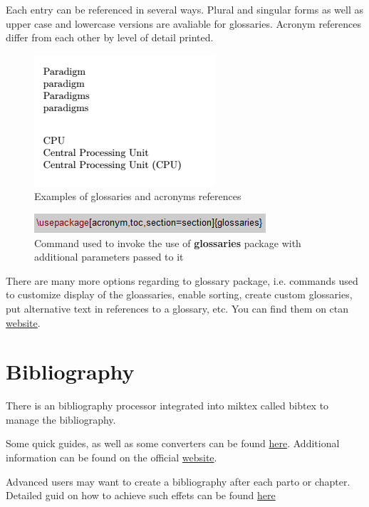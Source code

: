 Each entry can be referenced in several ways. Plural and singular forms as well as upper case and lowercase versions are avaliable for glossaries. Acronym references differ from each other by level of detail printed.

\begin{figure}[H]
\centering
\includegraphics[scale=1.0]{LaTeX/figures/glossary_calls.png}
\caption{Examples of glossaries and acronyms references}
\end{figure}

\begin{figure}[H]
\centering
\includegraphics[scale=1.0]{LaTeX/figures/usepackage_glossaries.png}
\caption{Command used to invoke the use of \textbf{glossaries} package with additional parameters passed to it}
\label{fig:usepackage_glossaries}
\end{figure}

There are many more options regarding to glossary package, i.e. commands used to customize display of the gloassaries, enable sorting, create custom glossaries, put alternative text in references to a glossary, etc. You can find them on \acrshort{ctan} \href{https://www.ctan.org/pkg/glossaries}{website}.

\section{Bibliography}

There is an bibliography processor integrated into \Gls{miktex} called \Gls{bibtex} to manage the bibliography.

Some quick guides, as well as some converters can be found \href{https://www.bibtex.com/g/bibtex-format/}{here}. Additional information can be found on the official \href{https://tug.org/bibtex/}{website}.

Advanced users may want to create a bibliography after each parto or chapter. Detailed guid on how to achieve such effets can be found \href{https://tex.stackexchange.com/questions/229846/different-bibliographies-for-each-chapter-with-shared-references}{here}

